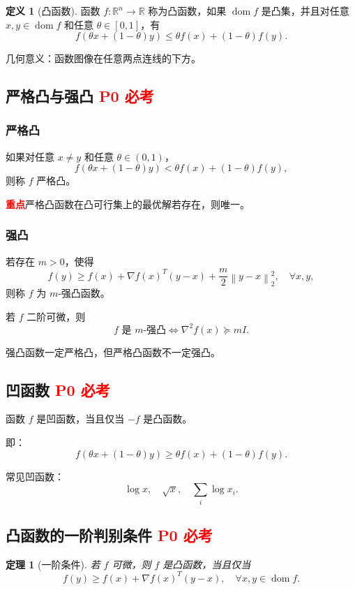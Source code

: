 \documentclass[11pt,a4paper]{ctexart}
\newcommand{\R}{\mathbb{R}}
\newcommand{\dom}{\operatorname{dom}}
\newcommand{\norm}[1]{\left\lVert #1 \right\rVert}
\newcommand{\Pzero}{\textcolor{red}{\textbf{P0 必考}}}
\newcommand{\key}{\textcolor{red}{\textbf{重点}}}
\theoremstyle{definition}
\newtheorem{definition}{定义}[section]
\theoremstyle{plain}
\newtheorem{theorem}{定理}[section]
\theoremstyle{remark}
\begin{document}
\begin{definition}[凸函数]
函数 $f:\R^n\to\R$ 称为凸函数，如果 $\dom f$ 是凸集，并且对任意 $x,y\in\dom f$ 和任意 $\theta\in[0,1]$，有
\[
    f(\theta x+(1-\theta)y)
    \le
    \theta f(x)+(1-\theta)f(y).
\]
\end{definition}

几何意义：函数图像在任意两点连线的下方。

\subsection{严格凸与强凸 \Pzero}

\subsubsection*{严格凸}

如果对任意 $x\neq y$ 和任意 $\theta\in(0,1)$，
\[
    f(\theta x+(1-\theta)y)
    <
    \theta f(x)+(1-\theta)f(y),
\]
则称 $f$ 严格凸。

\key{严格凸函数在凸可行集上的最优解若存在，则唯一。}

\subsubsection*{强凸}

若存在 $m>0$，使得
\[
    f(y)
    \ge
    f(x)+\nabla f(x)^T(y-x)+\frac{m}{2}\norm{y-x}_2^2,
    \quad \forall x,y,
\]
则称 $f$ 为 $m$-强凸函数。

若 $f$ 二阶可微，则
\[
    f \text{ 是 } m\text{-强凸}
    \Longleftrightarrow
    \nabla^2 f(x)\succeq mI.
\]

强凸函数一定严格凸，但严格凸函数不一定强凸。

\subsection{凹函数 \Pzero}

函数 $f$ 是凹函数，当且仅当 $-f$ 是凸函数。

即：
\[
    f(\theta x+(1-\theta)y)
    \ge
    \theta f(x)+(1-\theta)f(y).
\]

常见凹函数：
\[
    \log x,\quad \sqrt{x},\quad \sum_i \log x_i.
\]

\subsection{凸函数的一阶判别条件 \Pzero}

\begin{theorem}[一阶条件]
若 $f$ 可微，则 $f$ 是凸函数，当且仅当
\[
    f(y)\ge f(x)+\nabla f(x)^T(y-x),
    \quad \forall x,y\in\dom f.
\]
\end{theorem}
\end{document}
